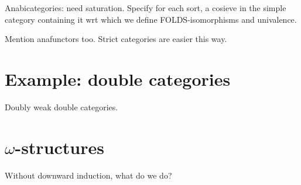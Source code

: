 \documentclass{amsart}
\begin{document}
Anabicategories: need saturation.
Specify for each sort, a cosieve in the simple category containing it wrt which we define FOLDS-isomorphisms and univalence.

Mention anafunctors too.
Strict categories are easier this way.


\section{Example: double categories}
\label{sec:dblcats}

Doubly weak double categories.


\section{$\omega$-structures}
\label{sec:omega-structures}

Without downward induction, what do we do?




\end{document}
